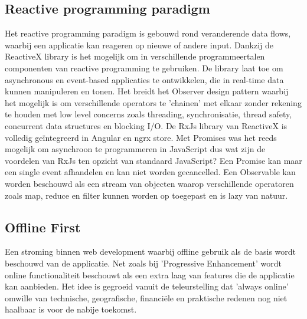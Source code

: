 \subsection{Reactive programming paradigm}
Het reactive programming paradigm is gebouwd rond veranderende data flows, waarbij een applicatie kan reageren op nieuwe of andere input. Dankzij de ReactiveX library is het mogelijk om in verschillende programmeertalen componenten van reactive programming te gebruiken. De library laat toe om asynchronous en event-based applicaties te ontwikkelen, die in real-time data kunnen manipuleren en tonen. Het breidt het Observer design pattern waarbij het mogelijk is om verschillende operators te 'chainen' met elkaar zonder rekening te houden met low level concerns zoals threading, synchronisatie, thread safety, concurrent data structures en blocking I/O. De RxJs library van ReactiveX is volledig ge\"integreerd in Angular en ngrx store. Met Promises was het reeds mogelijk om asynchroon te programmeren in JavaScript dus wat zijn de voordelen van RxJs ten opzicht van standaard JavaScript? Een Promise kan maar een single event afhandelen en kan niet worden gecancelled. Een Observable kan worden beschouwd als een stream van objecten waarop verschillende operatoren zoals map, reduce en filter kunnen worden op toegepast en is lazy van natuur.
\subsection{Offline First}
Een stroming binnen web development waarbij offline gebruik als de basis wordt beschouwd van de applicatie. Net zoals bij 'Progressive Enhancement' wordt online functionaliteit beschouwt als een extra laag van features die de applicatie kan aanbieden. Het idee is gegroeid vanuit de teleurstelling dat 'always online' omwille van technische, geografische, financi\"ele en praktische redenen nog niet haalbaar is voor de nabije toekomst.
